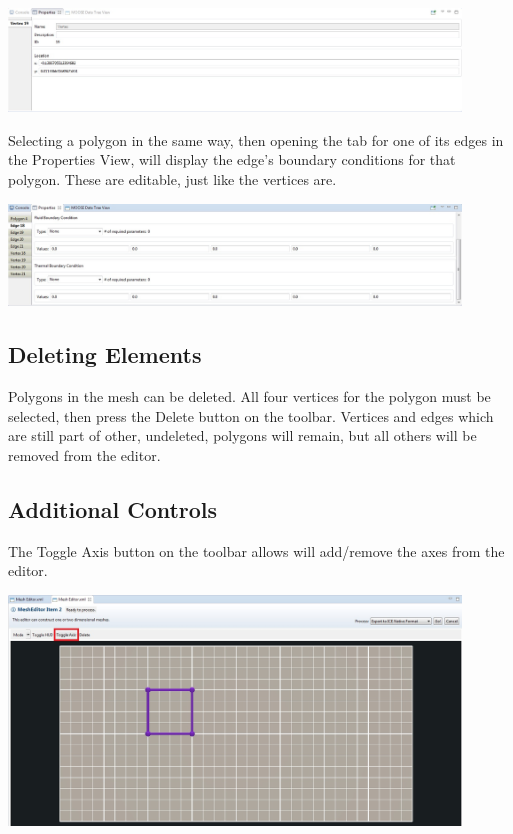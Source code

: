 \documentclass{article}
\begin{document}
\begin{center}
\includegraphics[width=12cm]{images/VertexPropertiesView}
\end{center}

Selecting a polygon in the same way, then opening the tab for one of its edges
in the Properties View, will display the edge's boundary conditions for that
polygon. These are editable, just like the vertices are.

\begin{center}
\includegraphics[width=12cm]{images/EdgeBoundaryConditions}
\end{center}

\subsection{Deleting Elements}

Polygons in the mesh can be deleted. All four vertices for the polygon must be
selected, then press the Delete button on the toolbar. Vertices and edges which
are still part of other, undeleted, polygons will remain, but all others will be
removed from the editor.

\subsection{Additional Controls}

The Toggle Axis button on the toolbar allows will add/remove the axes from the
editor. 

\begin{center}
\includegraphics[width=12cm]{images/MeshEditorToggleAxis}
\end{center}
\end{document}
